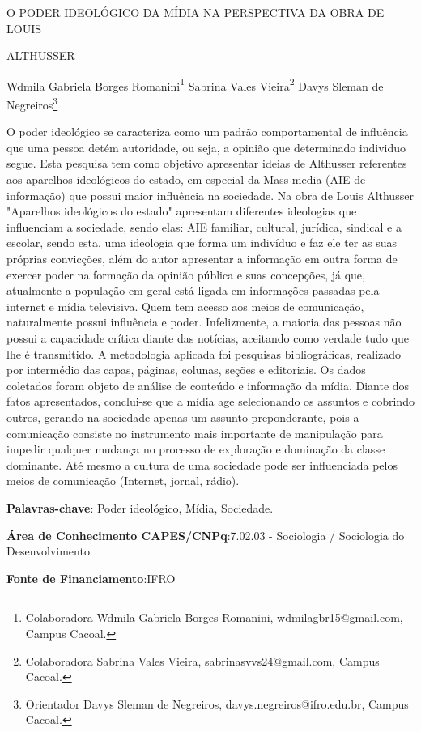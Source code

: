 \documentclass[article,12pt,onesidea,4paper,english,brazil]{abntex2}
\begin{document}
	
	
	\frenchspacing 
	
	\begin{center}
		\LARGE O PODER IDEOLÓGICO DA MÍDIA NA PERSPECTIVA DA OBRA DE LOUIS
		
		ALTHUSSER
		
		\normalsize
		Wdmila Gabriela Borges Romanini\footnote{Colaboradora Wdmila Gabriela Borges Romanini, wdmilagbr15@gmail.com, Campus Cacoal.} 
		Sabrina Vales Vieira\footnote{Colaboradora Sabrina Vales Vieira, sabrinasvvs24@gmail.com, Campus Cacoal.} 
		Davys Sleman de Negreiros\footnote{Orientador Davys Sleman de Negreiros, davys.negreiros@ifro.edu.br, Campus Cacoal.} 
		
	\end{center}
	
	\noindent O poder ideológico se caracteriza como um padrão comportamental de influência
	que uma pessoa detém autoridade, ou seja, a opinião que determinado individuo
	segue. Esta pesquisa tem como objetivo apresentar ideias de Althusser referentes
	aos aparelhos ideológicos do estado, em especial da Mass media (AIE de
	informação) que possui maior influência na sociedade. Na obra de Louis Althusser
	"Aparelhos ideológicos do estado" apresentam diferentes ideologias que influenciam
	a sociedade, sendo elas: AIE familiar, cultural, jurídica, sindical e a escolar, sendo
	esta, uma ideologia que forma um indivíduo e faz ele ter as suas próprias
	convicções, além do autor apresentar a informação em outra forma de exercer poder
	na formação da opinião pública e suas concepções, já que, atualmente a população
	em geral está ligada em informações passadas pela internet e mídia televisiva.
	Quem tem acesso aos meios de comunicação, naturalmente possui influência e
	poder. Infelizmente, a maioria das pessoas não possui a capacidade crítica diante
	das notícias, aceitando como verdade tudo que lhe é transmitido. A metodologia
	aplicada foi pesquisas bibliográficas, realizado por intermédio das capas, páginas,
	colunas, seções e editoriais. Os dados coletados foram objeto de análise de
	conteúdo e informação da mídia. Diante dos fatos apresentados, conclui-se que a
	mídia age selecionando os assuntos e cobrindo outros, gerando na sociedade
	apenas um assunto preponderante, pois a comunicação consiste no instrumento
	mais importante de manipulação para impedir qualquer mudança no processo de
	exploração e dominação da classe dominante. Até mesmo a cultura de uma
	sociedade pode ser influenciada pelos meios de comunicação (Internet, jornal,
	rádio).
	
	\vspace{\onelineskip}
	
	\noindent
	\textbf{Palavras-chave}: Poder ideológico, Mídia, Sociedade.
	
	\noindent
	\textbf{Área de Conhecimento CAPES/CNPq}:7.02.03 - Sociologia / Sociologia do
	Desenvolvimento
	
	\noindent
	\textbf{Fonte de Financiamento}:IFRO
	
\end{document}
